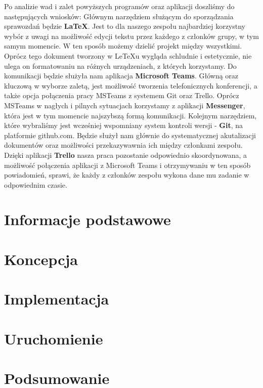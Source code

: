 \documentclass[a4paper,titleauthor]{mwart}
\begin{document}
Po analizie wad i zalet powyższych programów oraz aplikacji doszliśmy do następujących wniosków: \newline
Głównym narzędziem służącym do sporządzania sprawozdań będzie \textbf{LaTeX}. Jest to dla naszego zespołu najbardziej korzystny wybór z uwagi na możliwość edycji tekstu przez każdego z członków grupy, w tym samym momencie. W ten sposób możemy dzielić projekt między wszystkimi. Oprócz tego dokument tworzony w LeTeXu wygląda schludnie i estetycznie, nie ulega on formatowaniu na różnych urządzeniach, z których korzystamy. 
Do komunikacji będzie służyła nam aplikacja \textbf{Microsoft Teams}. Główną oraz kluczową w wyborze zaletą, jest możliwość tworzenia telefonicznych konferencji, a także opcja połączenia pracy MSTeams z systemem Git oraz Trello.
Oprócz MSTeams w nagłych i pilnych sytuacjach korzystamy z aplikacji \textbf{Messenger}, która jest w tym momencie najszybszą formą komunikacji. 
Kolejnym narzędziem, które wybraliśmy jest wcześniej wspomniany system kontroli wersji - \textbf{Git}, na platformie github.com.
Będzie służył nam głównie do systematycznej akutalizacji dokumentów oraz możliwości przekazywawnia ich między członkami zespołu. 
Dzięki aplikacji \textbf{Trello} nasza praca pozostanie odpowiednio skoordynowana, a możliwość połączenia aplikacji z Microsoft Teams i otrzymywaniu w ten sposób powiadomień, sprawi, że każdy z członków zespołu wykona dane mu zadanie w odpowiednim czasie. 


\section{Informacje podstawowe}
\label{sec:informacje_podstawowe}

\section{Koncepcja}
\label{sec:koncepcja}

\section{Implementacja}
\label{sec:implementacja}


\section{Uruchomienie}
\label{sec:uruchomienie}


\section{Podsumowanie}
\label{sec:podsumowanie}
\end{document}
